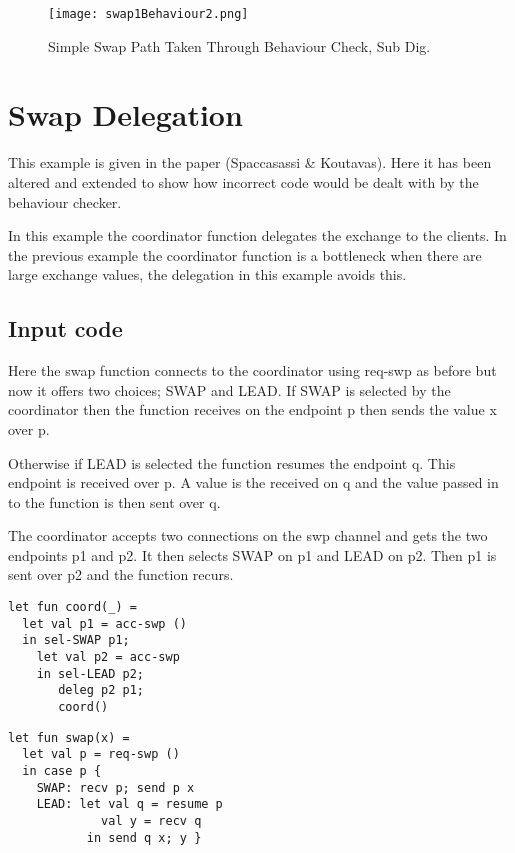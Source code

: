 \begin{figure}
\texttt{[image: swap1Behaviour2.png]}
\caption{Simple Swap Path Taken Through Behaviour Check, Sub Dig.}
\label{path2}
\end{figure}

\FloatBarrier
\section{Swap Delegation}

This example is given in the paper (Spaccasassi \& Koutavas)\cite{paper1}. Here it has been altered and extended to show how incorrect code would be dealt with by the behaviour checker. 

In this example the coordinator function delegates the exchange to the clients. In the previous example the coordinator function is a bottleneck when there are large exchange values, the delegation in this example avoids this. 

\subsection{Input code}

Here the swap function connects to the coordinator using req-swp as before but now it offers two choices; SWAP and LEAD. If SWAP is selected by the coordinator then the function receives on the endpoint p then sends the value x over p. 

Otherwise if LEAD is selected the function resumes the endpoint q. This endpoint is received over p. A value is the received on q and the value passed in to the function is then sent over q. 

The coordinator accepts two connections on the swp channel and gets the two endpoints p1 and p2. It then selects SWAP on p1 and LEAD on p2. Then p1 is sent over p2 and the function recurs. 

\begin{minipage}{.45\textwidth}
\begin{lstlisting}[backgroundcolor=\color{white},numbers=none]
let fun coord(_) =
  let val p1 = acc-swp ()
  in sel-SWAP p1;
    let val p2 = acc-swp
    in sel-LEAD p2;
       deleg p2 p1;
       coord()
\end{lstlisting}
\end{minipage}
\hfill
\begin{minipage}{.45\textwidth}
\begin{lstlisting}[backgroundcolor=\color{white},numbers=none]
let fun swap(x) =
  let val p = req-swp ()
  in case p {
    SWAP: recv p; send p x
    LEAD: let val q = resume p
             val y = recv q
           in send q x; y }
\end{lstlisting}
\end{minipage}

